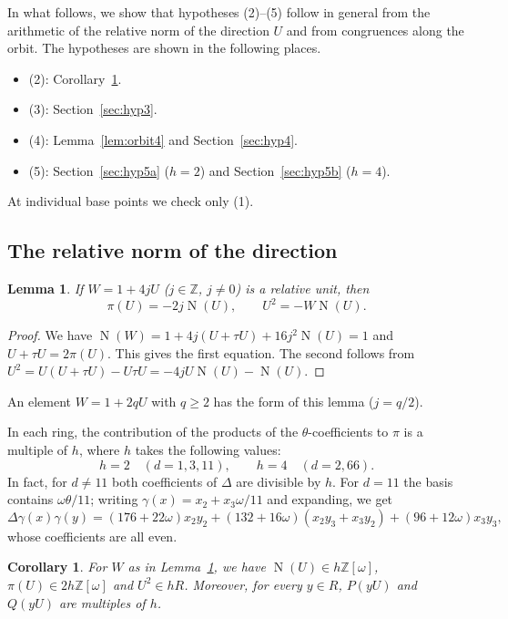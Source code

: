 \documentclass[a4paper,11pt]{article}
\theoremstyle{plain}
\newtheorem{lemma}[theorem]{Lemma}
\newtheorem{corollary}[theorem]{Corollary}
\theoremstyle{definition}
\theoremstyle{remark}
\numberwithin{equation}{section}
\numberwithin{table}{section}
\newcommand{\Z}{\mathbb{Z}}
\newcommand{\Nm}{\operatorname{N}}
\begin{document}
In what follows, we show that hypotheses (2)--(5) follow in general from the arithmetic of the relative norm of the direction $U$ and from congruences along the orbit.
The hypotheses are shown in the following places.
\begin{itemize}
\item (2): Corollary~\ref{cor:width}.
\item (3): Section~\ref{sec:hyp3}.
\item (4): Lemma~\ref{lem:orbit4} and Section~\ref{sec:hyp4}.
\item (5): Section~\ref{sec:hyp5a} ($h=2$) and Section~\ref{sec:hyp5b} ($h=4$).
\end{itemize}
At individual base points we check only (1).

\subsection{The relative norm of the direction}

\begin{lemma}\label{lem:direction}
If $W=1+4jU$ ($j\in\Z$, $j\ne0$) is a relative unit, then
\[
\pi(U)=-2j\Nm(U),\qquad U^2=-W\Nm(U).
\]
\end{lemma}

\begin{proof}
We have $\Nm(W)=1+4j(U+\tau U)+16j^2\Nm(U)=1$ and $U+\tau U=2\pi(U)$. This gives the first equation.
The second follows from $U^2=U(U+\tau U)-U\tau U=-4jU\Nm(U)-\Nm(U)$.
\end{proof}

An element $W=1+2qU$ with $q\ge2$ has the form of this lemma ($j=q/2$).

In each ring, the contribution of the products of the $\theta$-coefficients to $\pi$ is a multiple of $h$, where $h$ takes the following values:
\[
h=2\quad(d=1,3,11),\qquad h=4\quad(d=2,66).
\]
In fact, for $d\ne11$ both coefficients of $\Delta$ are divisible by $h$. For $d=11$ the basis contains $\omega\theta/11$; writing $\gamma(x)=x_2+x_3\omega/11$ and expanding, we get
\[
\Delta\gamma(x)\gamma(y)=(176+22\omega)x_2y_2+(132+16\omega)(x_2y_3+x_3y_2)+(96+12\omega)x_3y_3,
\]
whose coefficients are all even.

\begin{corollary}\label{cor:width}
For $W$ as in Lemma~\ref{lem:direction}, we have $\Nm(U)\in h\Z[\omega]$, $\pi(U)\in2h\Z[\omega]$ and $U^2\in hR$.
Moreover, for every $y\in R$, $P(yU)$ and $Q(yU)$ are multiples of $h$.
\end{corollary}
\end{document}
